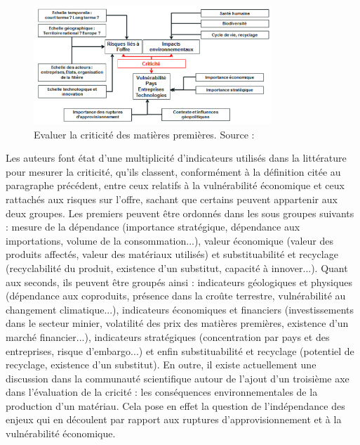 \begin{figure}
    \centering
    \includegraphics[width=0.8\textwidth]{Images/02 appro/schema criticite.png}
    \caption{Evaluer la criticité des matières premières. Source : \cite{hache_vers_2019}}
    \label{fig:criticite}
\end{figure}
Les auteurs font état d'une multiplicité d'indicateurs utilisés dans la littérature pour mesurer la criticité, qu'ils classent, conformément à la définition citée au paragraphe précédent, entre ceux relatifs à la vulnérabilité économique et ceux rattachés aux risques sur l'offre, sachant que certains peuvent appartenir aux deux groupes. Les premiers peuvent être ordonnés dans les sous groupes suivants : mesure de la dépendance (importance stratégique, dépendance aux importations, volume de la consommation...), valeur économique (valeur des produits affectés, valeur des matériaux utilisés) et substituabilité et recyclage (recyclabilité du produit, existence d'un substitut, capacité à innover...). Quant aux seconds, ils peuvent être groupés ainsi : indicateurs géologiques et physiques (dépendance aux coproduits, présence dans la croûte terrestre, vulnérabilité au changement climatique...), indicateurs économiques et financiers (investissements dans le secteur minier, volatilité des prix des matières premières, existence d'un marché financier...), indicateurs stratégiques (concentration par pays et des entreprises, risque d'embargo...) et enfin substituabilité et recyclage (potentiel de recyclage, existence d'un substitut). En outre, il existe actuellement une discussion dans la communauté scientifique autour de l'ajout d'un troisième axe dans l'évaluation de la cricité : les conséquences environnementales de la production d'un matériau. Cela pose en effet la question de l'indépendance des enjeux qui en découlent par rapport aux ruptures d'approvisionnement et à la vulnérabilité économique.
\smallbreak

